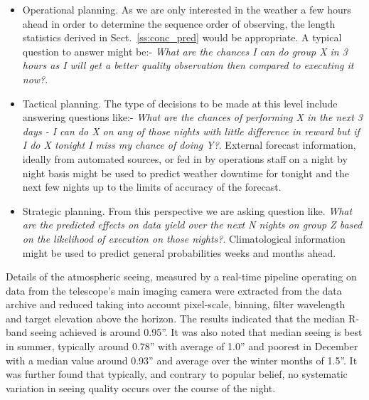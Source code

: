\begin{itemize}
\item Operational planning. As we are only interested in the weather a few hours ahead in order to determine the sequence order of observing, the length statistics derived in Sect.~\ref{ss:conc_pred} would be appropriate. A typical question to answer might be:- \emph{What are the chances I can do group X in 3 hours as I will get a better quality observation then compared to executing it now?}.

\item Tactical planning. The type of decisions to be made at this level include answering questions like:- \emph{What are the chances of performing X in the next 3 days - I can do X on any of those nights with little difference in reward but if I do X tonight I miss my chance of doing Y?}. External forecast information, ideally from automated sources, or fed in by operations staff on a night by night basis might be used to predict weather downtime for tonight and the next few nights up to the limits of accuracy of the forecast.

\item Strategic planning. From this perspective we are asking question like. \emph{What are the predicted effects on data yield over the next N nights on group Z based on the likelihood of execution on those nights?}. Climatological information might be used to predict general probabilities weeks and months ahead.

\end{itemize}

Details of the atmospheric seeing, measured by a real-time pipeline operating on data from the telescope's main imaging camera were extracted from the data archive and reduced taking into account pixel-scale, binning, filter wavelength and target elevation above the horizon. The results indicated that the median R-band seeing achieved is around 0.95''. It was also noted that median seeing is best in summer, typically around 0.78'' with average of 1.0'' and poorest in December with a median value around 0.93'' and average over the winter months of 1.5''. It was further found that typically, and contrary to popular belief, no systematic variation in seeing quality occurs over the course of the night.





